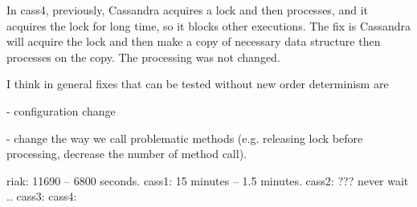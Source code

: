In cass4, previously, Cassandra acquires a lock and then processes, and it
acquires the lock for long time, so it blocks other executions.  The fix
is Cassandra will acquire the lock and then make a copy of necessary data
structure then processes on the copy. The processing was not changed.

I think in general fixes that can be tested without new order determinism are

- configuration change

- change the way we call problematic methods (e.g. releasing lock before
processing, decrease the number of method call).


\fi

riak: 11690 -- 6800 seconds.
cass1: 15 minutes -- 1.5 minutes.
cass2: ??? never wait .. 
cass3: 
cass4: 
\fi

